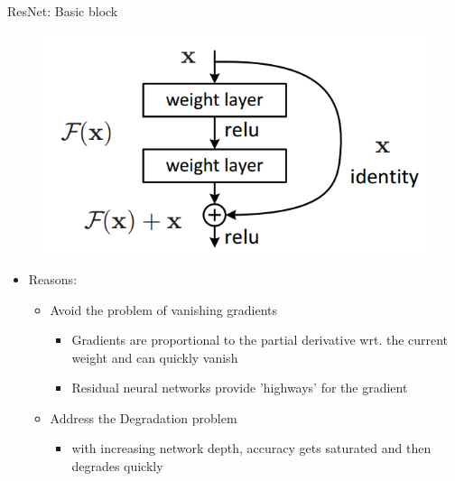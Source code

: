 \documentclass{beamer}
\begin{document}
\begin{frame}{ResNet: Basic block}

\begin{figure}
    \centering
    \includegraphics[scale=0.3]{images/basicblock.png}
\end{figure}

\begin{itemize}
    \item Reasons:
    \begin{itemize}
        \item Avoid the problem of vanishing gradients
        \begin{itemize}
            \item[\ding{43}] Gradients are proportional to the partial derivative wrt. the current weight and can quickly vanish
            \item[\ding{43}] Residual neural networks provide 'highways' for the gradient
        \end{itemize}
        \item Address the Degradation problem
        \begin{itemize}
            \item[\ding{43}] with increasing network depth, accuracy gets saturated and then degrades quickly
        \end{itemize}
    \end{itemize}
\end{itemize}
    
\end{frame}
\end{document}
